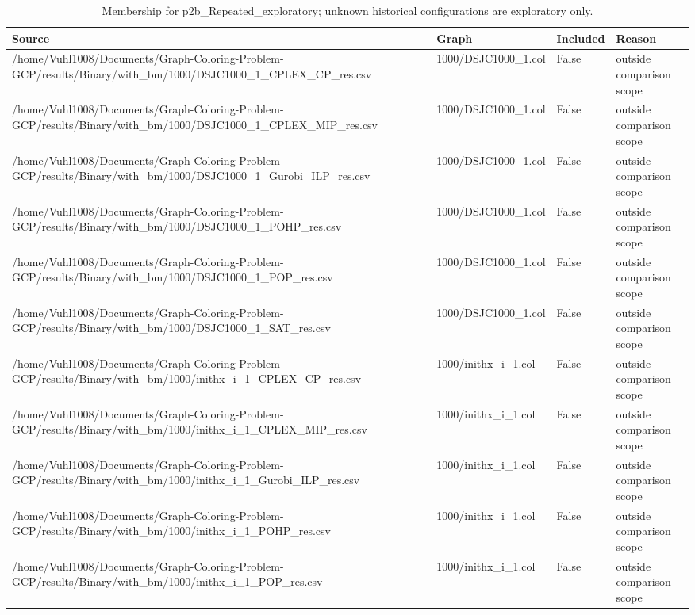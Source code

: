 \begin{table}[htbp]
\centering
\caption{Membership for p2b\_Repeated\_exploratory; unknown historical configurations are exploratory only.}
\label{tab:p2b-Repeated-exploratory-membership}
\begin{tabular}{llll}
\hline
Source & Graph & Included & Reason \\
\hline
/home/Vuhl1008/Documents/Graph-Coloring-Problem-GCP/results/Binary/with\_bm/1000/DSJC1000\_1\_CPLEX\_CP\_res.csv & 1000/DSJC1000\_1.col & False & outside comparison scope \\
/home/Vuhl1008/Documents/Graph-Coloring-Problem-GCP/results/Binary/with\_bm/1000/DSJC1000\_1\_CPLEX\_MIP\_res.csv & 1000/DSJC1000\_1.col & False & outside comparison scope \\
/home/Vuhl1008/Documents/Graph-Coloring-Problem-GCP/results/Binary/with\_bm/1000/DSJC1000\_1\_Gurobi\_ILP\_res.csv & 1000/DSJC1000\_1.col & False & outside comparison scope \\
/home/Vuhl1008/Documents/Graph-Coloring-Problem-GCP/results/Binary/with\_bm/1000/DSJC1000\_1\_POHP\_res.csv & 1000/DSJC1000\_1.col & False & outside comparison scope \\
/home/Vuhl1008/Documents/Graph-Coloring-Problem-GCP/results/Binary/with\_bm/1000/DSJC1000\_1\_POP\_res.csv & 1000/DSJC1000\_1.col & False & outside comparison scope \\
/home/Vuhl1008/Documents/Graph-Coloring-Problem-GCP/results/Binary/with\_bm/1000/DSJC1000\_1\_SAT\_res.csv & 1000/DSJC1000\_1.col & False & outside comparison scope \\
/home/Vuhl1008/Documents/Graph-Coloring-Problem-GCP/results/Binary/with\_bm/1000/inithx\_i\_1\_CPLEX\_CP\_res.csv & 1000/inithx\_i\_1.col & False & outside comparison scope \\
/home/Vuhl1008/Documents/Graph-Coloring-Problem-GCP/results/Binary/with\_bm/1000/inithx\_i\_1\_CPLEX\_MIP\_res.csv & 1000/inithx\_i\_1.col & False & outside comparison scope \\
/home/Vuhl1008/Documents/Graph-Coloring-Problem-GCP/results/Binary/with\_bm/1000/inithx\_i\_1\_Gurobi\_ILP\_res.csv & 1000/inithx\_i\_1.col & False & outside comparison scope \\
/home/Vuhl1008/Documents/Graph-Coloring-Problem-GCP/results/Binary/with\_bm/1000/inithx\_i\_1\_POHP\_res.csv & 1000/inithx\_i\_1.col & False & outside comparison scope \\
/home/Vuhl1008/Documents/Graph-Coloring-Problem-GCP/results/Binary/with\_bm/1000/inithx\_i\_1\_POP\_res.csv & 1000/inithx\_i\_1.col & False & outside comparison scope \\

\end{tabular}
\end{table}

